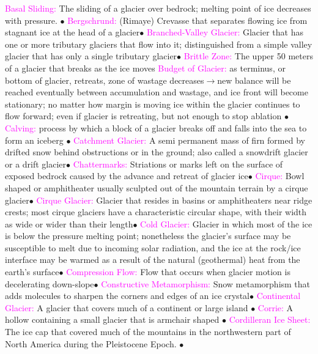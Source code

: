 \documentclass{article}
\newcommand{\ddd}{$\bullet$}
\newcommand{\pink}[1]{\textcolor{magenta}{#1}}
\newcommand{\vocab}[1]{{\pink{#1}}}
\begin{document}
\begin{multicols*}{4}
		\vocab{        Basal Sliding: } The sliding of a glacier over bedrock; melting point of ice decreases with pressure. \ddd
		\vocab{        Bergschrund: } (Rimaye) Crevasse that separates flowing ice from stagnant ice at the head of a glacier\ddd
		\vocab{        Branched-Valley Glacier: } Glacier that has one or more tributary glaciers that flow into it; distinguished from a simple valley glacier that has only a single tributary glacier\ddd
		\vocab{       Brittle Zone: }The upper 50 meters of a glacier that breaks as the ice moves
		\vocab{Budget of Glacier: } as terminus, or bottom of glacier, retreats, zone of wastage decreases$ \rightarrow $new balance will be reached eventually between accumulation and wastage, and ice front will become stationary; no matter how margin is moving ice within the glacier continues to flow forward; even if glacier is retreating, but not enough to stop ablation \ddd
		\vocab{Calving: } process by which a block of a glacier breaks off and falls into the sea to form an iceberg \ddd
		\vocab{        Catchment Glacier: } A semi permanent mass of firn formed by drifted snow behind obstructions or in the ground; also called a snowdrift glacier or a drift glacier\ddd
		\vocab{        Chattermarks: } Striations or marks left on the surface of exposed bedrock caused by the advance and retreat of glacier ice\ddd
		\vocab{        Cirque: } Bowl shaped or amphitheater usually sculpted out of the mountain terrain by a cirque glacier\ddd
		\vocab{        Cirque Glacier: } Glacier that resides in basins or amphitheaters near ridge crests; most cirque glaciers have a characteristic circular shape, with their width as wide or wider than their length\ddd
		\vocab{        Cold Glacier: } Glacier in which most of the ice is below the pressure melting point; nonetheless the glacier’s surface may be susceptible to melt due to incoming solar radiation, and the ice at the rock/ice interface may be warmed as a result of the natural (geothermal) heat from the earth’s surface\ddd
		\vocab{        Compression Flow: } Flow that occurs when glacier motion is decelerating down-slope\ddd
		\vocab{        Constructive Metamorphism: } Snow metamorphism that adds molecules to sharpen the corners and edges of an ice crystal\ddd
		\vocab{ Continental Glacier: }A glacier that covers much of a continent or large island \ddd
		\vocab{Corrie: } A hollow containing a small glacier that is armchair shaped \ddd
		\vocab{Cordilleran Ice Sheet: }The ice cap that covered much of the mountains in the northwestern part of North America during the Pleistocene Epoch. \ddd

\end{multicols*}
\end{document}
